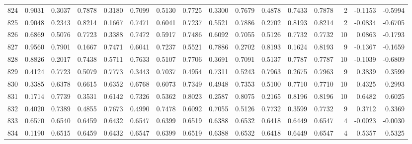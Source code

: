 \begin{tabular}{lrrrrrrrrrrrrrrr}
824 &      0.9031 &  0.3037 &  0.7878 &  0.3180 &  0.7099 &  0.5130 &  0.7725 &  0.3300 &  0.7679 &  0.4878 &   0.7433 &     0.7878 &      2 &                   -0.1153 &                    -0.5994 \\
825 &      0.9048 &  0.2343 &  0.8214 &  0.1667 &  0.7471 &  0.6041 &  0.7237 &  0.5521 &  0.7886 &  0.2702 &   0.8193 &     0.8214 &      2 &                   -0.0834 &                    -0.6705 \\
826 &      0.6869 &  0.5076 &  0.7723 &  0.3388 &  0.7472 &  0.5917 &  0.7486 &  0.6092 &  0.7055 &  0.5126 &   0.7732 &     0.7732 &     10 &                    0.0863 &                    -0.1793 \\
827 &      0.9560 &  0.7901 &  0.1667 &  0.7471 &  0.6041 &  0.7237 &  0.5521 &  0.7886 &  0.2702 &  0.8193 &   0.1624 &     0.8193 &      9 &                   -0.1367 &                    -0.1659 \\
828 &      0.8826 &  0.2017 &  0.7438 &  0.5711 &  0.7633 &  0.5107 &  0.7706 &  0.3691 &  0.7091 &  0.5137 &   0.7787 &     0.7787 &     10 &                   -0.1039 &                    -0.6809 \\
829 &      0.4124 &  0.7723 &  0.5079 &  0.7773 &  0.3443 &  0.7037 &  0.4954 &  0.7311 &  0.5243 &  0.7963 &   0.2675 &     0.7963 &      9 &                    0.3839 &                     0.3599 \\
830 &      0.3385 &  0.6378 &  0.6615 &  0.6352 &  0.6768 &  0.6073 &  0.7349 &  0.4948 &  0.7353 &  0.5100 &   0.7710 &     0.7710 &     10 &                    0.4325 &                     0.2993 \\
831 &      0.1714 &  0.7739 &  0.3531 &  0.6142 &  0.7326 &  0.5362 &  0.8023 &  0.2587 &  0.8075 &  0.2165 &   0.8196 &     0.8196 &     10 &                    0.6482 &                     0.6025 \\
832 &      0.4020 &  0.7389 &  0.4855 &  0.7673 &  0.4990 &  0.7478 &  0.6092 &  0.7055 &  0.5126 &  0.7732 &   0.3599 &     0.7732 &      9 &                    0.3712 &                     0.3369 \\
833 &      0.6570 &  0.6540 &  0.6459 &  0.6432 &  0.6547 &  0.6399 &  0.6519 &  0.6388 &  0.6532 &  0.6418 &   0.6449 &     0.6547 &      4 &                   -0.0023 &                    -0.0030 \\
834 &      0.1190 &  0.6515 &  0.6459 &  0.6432 &  0.6547 &  0.6399 &  0.6519 &  0.6388 &  0.6532 &  0.6418 &   0.6449 &     0.6547 &      4 &                    0.5357 &                     0.5325 \\

\end{tabular}
